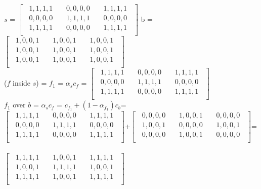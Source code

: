 \documentclass[12pt]{article}\usepackage{amsmath}
\begin{document}
$s$ = 
$\begin{bmatrix}
\;\; 1,1,1,1 \;\; & \;\; 0,0,0,0  \;\; & \;\; 1,1,1,1 \;\;\\
\;\; 0,0,0,0 \;\; & \;\; 1,1,1,1  \;\; & \;\; 0,0,0,0  \;\;\\
\;\; 1,1,1,1 \;\; & \;\; 0,0,0,0  \;\; & \;\; 1,1,1,1 \;\;\\
\end{bmatrix}$
b = 
$\begin{bmatrix}
\;\; 1,0,0,1 \;\; & \;\; 1,0,0,1  \;\; & \;\; 1,0,0,1 \;\;\\
\;\; 1,0,0,1 \;\; & \;\; 1,0,0,1  \;\; & \;\; 1,0,0,1 \;\;\\
\;\; 1,0,0,1 \;\; & \;\; 1,0,0,1  \;\; & \;\; 1,0,0,1 \;\;\\
\end{bmatrix}$\\
($f$ inside $s$) = $f_1$ = $\alpha_s c_f$ =
$\begin{bmatrix}
\;\; 1,1,1,1 \;\; & \;\; 0,0,0,0  \;\; & \;\; 1,1,1,1 \;\;\\
\;\; 0,0,0,0 \;\; & \;\; 1,1,1,1  \;\; & \;\; 0,0,0,0  \;\;\\
\;\; 1,1,1,1 \;\; & \;\; 0,0,0,0  \;\; & \;\; 1,1,1,1 \;\;\\
\end{bmatrix}$\\
$f_1$ over $b$ = $\alpha_s c_f$ = $c_{f_1} + (1-\alpha_{f_1})c_b$=\\
$\begin{bmatrix}
\;\; 1,1,1,1 \;\; & \;\; 0,0,0,0  \;\; & \;\; 1,1,1,1 \;\;\\
\;\; 0,0,0,0 \;\; & \;\; 1,1,1,1  \;\; & \;\; 0,0,0,0  \;\;\\
\;\; 1,1,1,1 \;\; & \;\; 0,0,0,0  \;\; & \;\; 1,1,1,1 \;\;\\
\end{bmatrix}$+$\begin{bmatrix}
\;\; 0,0,0,0 \;\; & \;\; 1,0,0,1  \;\; & \;\;  0,0,0,0 \;\;\\
\;\; 1,0,0,1 \;\; & \;\; 0,0,0,0  \;\; & \;\; 1,0,0,1 \;\;\\
\;\; 0,0,0,0 \;\; & \;\; 1,0,0,1  \;\; & \;\;  0,0,0,0 \;\;\\
\end{bmatrix}$=\\\\
$\begin{bmatrix}
\;\; 1,1,1,1 \;\; & \;\; 1,0,0,1  \;\; & \;\; 1,1,1,1 \;\;\\
\;\; 1,0,0,1 \;\; & \;\; 1,1,1,1  \;\; & \;\; 1,0,0,1  \;\;\\
\;\; 1,1,1,1 \;\; & \;\; 1,0,0,1  \;\; & \;\; 1,1,1,1 \;\;\\
\end{bmatrix}$
\end{document}

